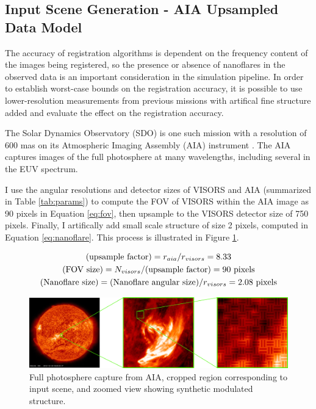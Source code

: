 \documentclass[tocnosub,noragright,centerchapter,12pt]{uiucecethesis09}
\begin{document}
\subsection{Input Scene Generation - AIA Upsampled Data Model} \label{sec:scene_aia}

The accuracy of registration algorithms is dependent on the frequency content of the images being registered, so the presence or absence of nanoflares in the observed data is an important consideration in the simulation pipeline.  In order to establish worst-case bounds on the registration accuracy, it is possible to use lower-resolution measurements from previous missions with artifical fine structure added and evaluate the effect on the registration accuracy.

The Solar Dynamics Observatory (SDO) is one such mission with a resolution of 600 mas on its Atmospheric Imaging Assembly (AIA) instrument \cite{sdo}.  The AIA captures images of the full photosphere at many wavelengths, including several in the EUV spectrum.

I use the angular resolutions and detector sizes of VISORS and AIA (summarized in Table \ref{tab:params}) to compute the FOV of VISORS within the AIA image as 90 pixels in Equation \ref{eq:fov}, then upsample to the VISORS detector size of 750 pixels.  Finally, I artifically add small scale structure of size 2 pixels, computed in Equation \ref{eq:nanoflare}.  This process is illustrated in Figure \ref{fig:aia_modulated}.


\begin{gather}
  {(\text{upsample factor})} = r_{aia} / r_{visors} = 8.33 \notag \\
  {(\text{FOV size})} = N_{visors} / {(\text{upsample factor})} = 90 \text{ pixels} \label{eq:fov} \\
  {(\text{Nanoflare size})} = {(\text{Nanoflare angular size})} / r_{visors} = 2.08 \text{ pixels} \label{eq:nanoflare}
\end{gather}

\begin{figure}
  \centering
  \includegraphics[width=1\textwidth]{figures/aia_modulated.png}
  \caption{Full photosphere capture from AIA, cropped region corresponding to input scene, and zoomed view showing synthetic modulated structure.}
  \label{fig:aia_modulated}
\end{figure}
\end{document}

